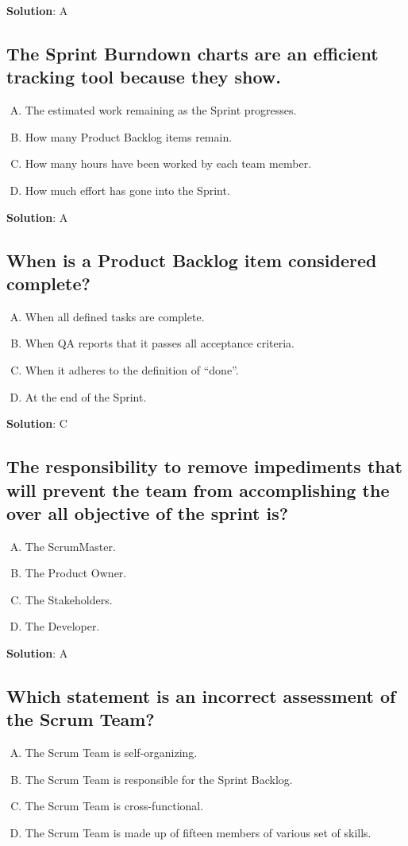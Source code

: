 \textbf{Solution}: A


\subsection{The Sprint Burndown charts are an efficient tracking tool because they show.}
\begin{enumerate}[A)]
  \item The estimated work remaining as the Sprint progresses.
  \item How many Product Backlog items remain.
  \item How many hours have been worked by each team member.
  \item How much effort has gone into the Sprint.
\end{enumerate}


\textbf{Solution}: A


\subsection{When is a Product Backlog item considered complete? }
\begin{enumerate}[A)]
  \item When all defined tasks are complete.
  \item When QA reports that it passes all acceptance criteria.
  \item When it adheres to the definition of \enquote{done}.
  \item At the end of the Sprint.
\end{enumerate}


\textbf{Solution}: C


\subsection{The responsibility to remove impediments that will prevent the team from accomplishing the over all objective of the sprint is?}
\begin{enumerate}[A)]
  \item The ScrumMaster.
  \item The Product Owner.
  \item The Stakeholders.
  \item The Developer.
\end{enumerate}


\textbf{Solution}: A


\subsection{Which statement is an incorrect assessment of the Scrum Team?}
\begin{enumerate}[A)]
  \item The Scrum Team is self-organizing.
  \item The Scrum Team is responsible for the Sprint Backlog.
  \item The Scrum Team is cross-functional.
  \item The Scrum Team is made up of fifteen members of various set of skills.
\end{enumerate}


